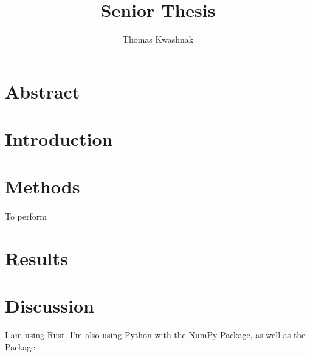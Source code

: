 \documentclass[12pt]{article}
\author{Thomas Kwashnak}
\title{Senior Thesis}
\begin{document}
\maketitle

\newpage

\tableofcontents

\newpage

\section{Abstract}



\section{Introduction}


\section{Methods}

\paragraph{} To perform 

\section{Results}

\section{Discussion}


I am using Rust\cite{lang_rust}. I'm also using Python with the NumPy\cite{package_numpy} Package, as well as the \cite{package_tensorflow} Package.

\nocite{liu_ml_framework_tech_debt}


\newpage


\end{document}
